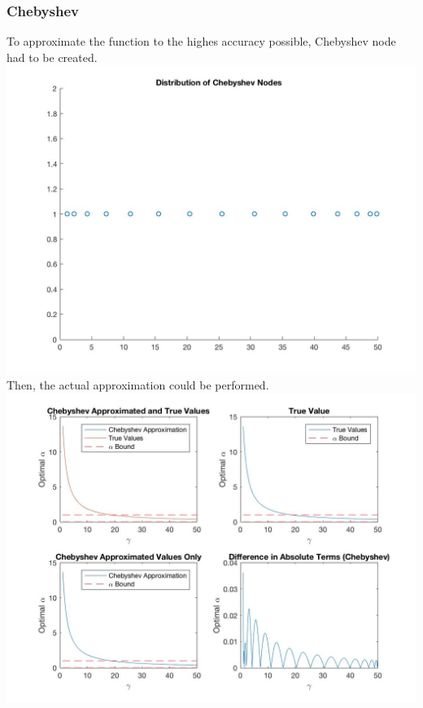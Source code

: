 \documentclass{article}
\begin{document}
\subsubsection{Chebyshev}
To approximate the function to the highes accuracy possible, Chebyshev node had to be created. \\
\includegraphics[width = \textwidth, keepaspectratio]{PS4Q3NODES.jpg} 
Then, the actual approximation could be performed. \\
\includegraphics[width = \textwidth, keepaspectratio]{PS4Q3CHEB.jpg} 
\end{document}
